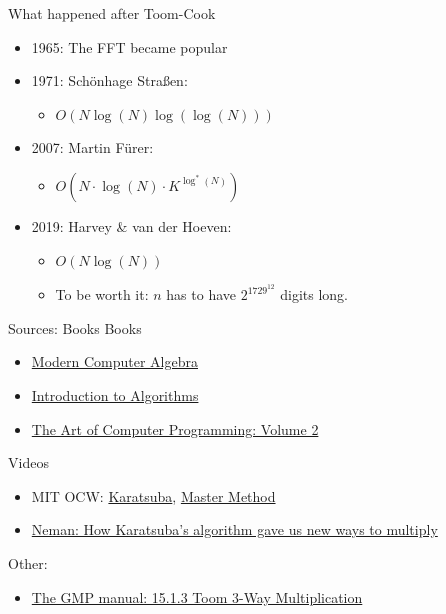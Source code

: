 \documentclass[12pt]{beamer}
\begin{document}
\begin{frame}{What happened after Toom-Cook}
\pause
\begin{itemize}
\item 1965: The FFT became popular
\pause
\item 1971: Sch\"onhage Stra\ss{}en:
\begin{itemize}
\item $O(N \log(N) \log(\log(N)))$
\end{itemize}
\pause
\item 2007: Martin F\"urer:
\begin{itemize}
\item $O(N \cdot \log(N) \cdot K^{\log^*(N)})$
\end{itemize}
\pause
\item 2019: Harvey \& van der Hoeven:
\begin{itemize}
\item $O(N \log(N))$
\item To be worth it: $n$ has to have $2^{1729^{12}}$ digits long.
\end{itemize}
\end{itemize}
\end{frame}

\begin{frame}{Sources: Books}
Books
\begin{itemize}
\item \href{https://doi.org/10.1017/CBO9781139856065}{Modern Computer Algebra}
\item \href{https://dl.acm.org/doi/book/10.5555/1614191}{Introduction to Algorithms}
\item \href{https://dl.acm.org/doi/book/10.5555/270146}{The Art of Computer Programming: Volume 2}
\end{itemize}
Videos
\begin{itemize}
\item MIT OCW: \href{https://www.youtube.com/watch?v=eCaXlAaN2uE&t=2538s}{Karatsuba}, \href{https://www.youtube.com/watch?v=whjt\_N9uYFI&t=2784s}{Master Method}
\item \href{https://www.youtube.com/watch?v=cCKOl5li6YM}{Neman: How Karatsuba's algorithm gave us new ways to multiply}
\end{itemize}
Other:
\begin{itemize}
\item \href{https://gmplib.org/manual/Toom-3\_002dWay-Multiplication}{The GMP manual: 15.1.3 Toom 3-Way Multiplication}
\end{itemize}
\end{frame}
\end{document}

